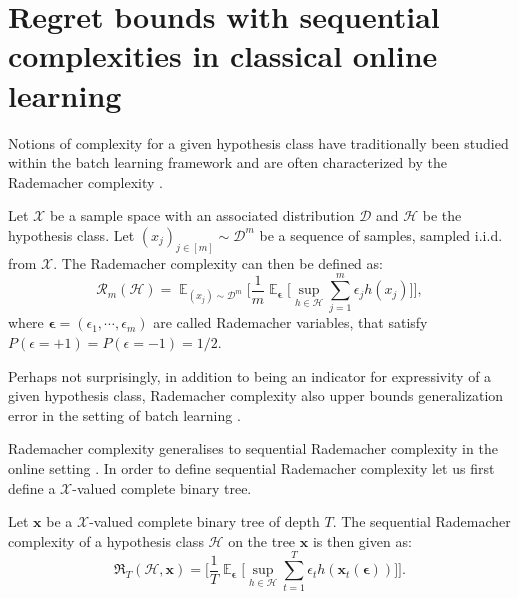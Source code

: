\section{Regret bounds with sequential complexities in classical online learning}\label{rademacher}

Notions of complexity for a given hypothesis class have traditionally been studied within the batch learning framework and are often characterized by the Rademacher complexity \citep{Rademacher}.

\begin{definition}
    Let $\mathcal{X}$ be a sample space with an associated distribution $\mathcal D$ and $\mathcal{H}$ be the hypothesis class. Let $(x_j)_{j\in[m]} \sim \mathcal D^m$ be a sequence of samples, sampled i.i.d. from $\mathcal{X}$. The Rademacher complexity can then be defined as:
    \begin{equation*}
\label{eq:rad_comp}
    \mathcal{R}_m (\mathcal{H}) = \mathop{\mathbb{E}}_{(x_j)\sim \mathcal D^m} \Big[\frac{1}{m} \mathop{\mathbb{E}}_{\boldsymbol{\epsilon}} \Big[ \sup_{h \in \mathcal{H}} \sum_{j=1}^m \epsilon_j h(x_j) \Big]
 \Big],
\end{equation*}
where $\boldsymbol{\epsilon} = (\epsilon_1, \cdots, \epsilon_m)$ are called Rademacher variables, that satisfy $P(\epsilon = +1) = P(\epsilon = -1) = 1/2$.
\end{definition}
Perhaps not surprisingly, in addition to being an indicator for expressivity of a given hypothesis class, Rademacher complexity also upper bounds generalization error in the setting of batch learning \citep{Rademacher}.

Rademacher complexity generalises to sequential Rademacher complexity in the online setting \citep{rakhlin2015online}. In order to define sequential Rademacher complexity let us first define a $\mathcal{X}$-valued complete binary tree. 

\begin{definition}
    Let $\mathbf{x}$ be a $\mathcal{X}$-valued complete binary tree of depth $T$. The sequential Rademacher complexity of a hypothesis class $\mathcal{H}$ on the tree $\mathbf{x}$ is then given as:
    \begin{equation*}
    \label{eq:seq_rad_comp}
        \mathfrak{R}_T (\mathcal{H}, \mathbf{x}) = \Big[\frac{1}{T} \mathop{\mathbb{E}}_{\boldsymbol{\epsilon}} \Big[ \sup_{h \in \mathcal{H}} \sum_{t=1}^T \epsilon_t h(\mathbf{x}_t(\boldsymbol{\epsilon})) \Big]
    \Big].
    \end{equation*}
\end{definition}

